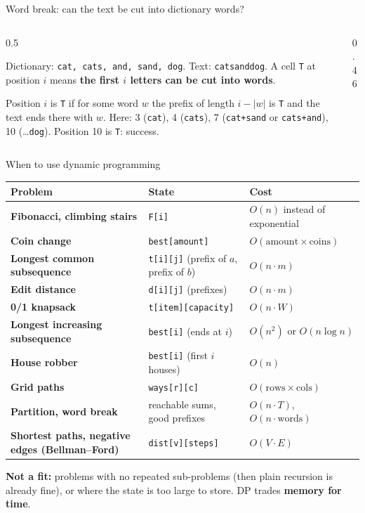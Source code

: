 \documentclass[aspectratio=169,10pt]{beamer}
\newcommand{\figtab}[2][0.5]{\begin{sfig}[#1]\end{sfig}}
\begin{document}
\begin{frame}{Word break: can the text be cut into dictionary words?}
\begin{columns}[T]
\begin{column}{0.5\textwidth}
\figtab[0.22]{fig_wb}
\vspace{1mm}
{\small
Dictionary: \texttt{cat, cats, and, sand, dog}. Text: \texttt{catsanddog}. A cell \texttt{T} at position $i$ means \textbf{the first $i$ letters can be cut into words}.

\vspace{1mm}
Position $i$ is \texttt{T} if for some word $w$ the prefix of length $i-|w|$ is \texttt{T} and the text ends there with $w$. Here: 3 (\texttt{cat}), 4 (\texttt{cats}), 7 (\texttt{cat+sand} or \texttt{cats+and}), 10 (\ldots\texttt{dog}). Position 10 is \texttt{T}: success.}
\end{column}
\begin{column}{0.46\textwidth}
\pycode[\fontsize{7.6}{9}\selectfont]{word_break}
\vspace{1mm}
\pyout[\fontsize{7.6}{9}\selectfont]{wb_demo}
\end{column}
\end{columns}
\end{frame}

\begin{frame}{When to use dynamic programming}
\renewcommand{\arraystretch}{1.1}\footnotesize
\begin{tabular}{@{}>{\raggedright\bfseries}p{40mm}>{\raggedright}p{52mm}>{\raggedright\arraybackslash}p{44mm}@{}}
\toprule
Problem & State & Cost\\\midrule
Fibonacci, climbing stairs & \texttt{F[i]} & $O(n)$ instead of exponential\\
Coin change & \texttt{best[amount]} & $O(\text{amount}\times\text{coins})$\\
Longest common subsequence & \texttt{t[i][j]} (prefix of $a$, prefix of $b$) & $O(n\cdot m)$\\
Edit distance & \texttt{d[i][j]} (prefixes) & $O(n\cdot m)$\\
0/1 knapsack & \texttt{t[item][capacity]} & $O(n\cdot W)$\\
Longest increasing subsequence & \texttt{best[i]} (ends at $i$) & $O(n^2)$ or $O(n\log n)$\\
House robber & \texttt{best[i]} (first $i$ houses) & $O(n)$\\
Grid paths & \texttt{ways[r][c]} & $O(\text{rows}\times\text{cols})$\\
Partition, word break & reachable sums, good prefixes & $O(n\cdot T)$, $O(n\cdot\text{words})$\\
Shortest paths, negative edges (Bellman--Ford) & \texttt{dist[v][steps]} & $O(V\cdot E)$\\
\bottomrule
\end{tabular}
\vspace{3mm}

{\small \textbf{Not a fit:} problems with no repeated sub-problems (then plain recursion is already fine), or where the state is too large to store. DP trades \textbf{memory for time}.}
\end{frame}
\end{document}
